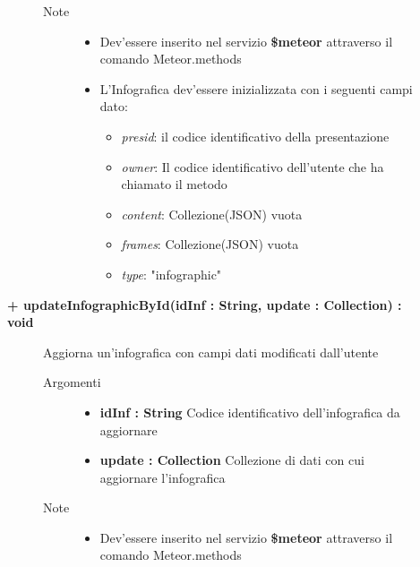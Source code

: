 \begin{description}
\begin{description}
\begin{description}
\begin{itemize}
				\end{itemize}
			\item[Note] \hfill
			\begin{itemize}
					\item Dev'essere inserito nel servizio \textbf{\$meteor} attraverso il comando Meteor.methods
					\item L'Infografica dev'essere inizializzata con i seguenti campi dato:
					\begin{itemize}
					\item \textit{presid}: il codice identificativo della presentazione
					\item \textit{owner}: Il codice identificativo dell'utente che ha chiamato il metodo
					\item \textit{content}: Collezione(JSON) vuota
					\item \textit{frames}: Collezione(JSON) vuota
					\item \textit{type}: "infographic"
					\end{itemize}
				\end{itemize}
		\end{description}
	\end{description}
	
	\begin{description}
		\item[\textbf{\color{blue}+ updateInfographicById(idInf : String, update : Collection) : void			}] \hfill
			Aggiorna un'infografica con campi dati modificati dall'utente
			
		\begin{description}
			\item[Argomenti] \hfill
				\begin{itemize}
				
					\item \textbf{idInf : String			} \hfill
					Codice identificativo dell'infografica da aggiornare
					\item \textbf{update : Collection			} \hfill
					Collezione di dati con cui aggiornare l'infografica
					
				\end{itemize}
			\item[Note] \hfill
			\begin{itemize}
					\item Dev'essere inserito nel servizio \textbf{\$meteor} attraverso il comando Meteor.methods
				\end{itemize}
		\end{description}
	\end{description}
	

\end{description}
